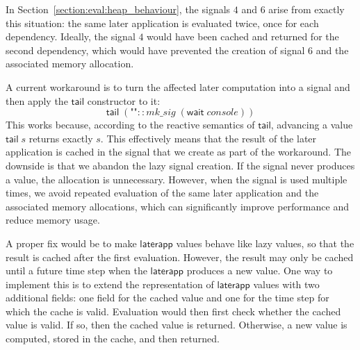 In Section~\ref{section:eval:heap_behaviour}, the signals $4$ and $6$ arise from exactly this situation: the same later application is evaluated twice, once for each dependency. Ideally, the signal $4$ would have been cached and returned for the second dependency, which would have prevented the creation of signal $6$ and the associated memory allocation. 

A current workaround is to turn the affected later computation into a signal and then apply the $\mathsf{tail}$ constructor to it:
\[
\mathsf{tail} \; (\texttt{""} :: mk\_sig \; (\mathsf{wait} \; console))
\]
This works because, according to the reactive semantics of $\mathsf{tail}$, advancing a value $\mathsf{tail} \; s$ returns exactly $s$.
This effectively means that the result of the later application is cached in the signal that we create as part of the workaround.
The downside is that we abandon the lazy signal creation. If the signal never produces a value, the allocation is unnecessary.
However, when the signal is used multiple times, we avoid repeated evaluation of the same later application and the associated memory allocations, which can significantly improve performance and reduce memory usage.

A proper fix would be to make $\mathsf{laterapp}$ values behave like lazy values, so that the result is cached after the first evaluation.
However, the result may only be cached until a future time step when the $\mathsf{laterapp}$ produces a new value.
One way to implement this is to extend the representation of $\mathsf{laterapp}$ values with two additional fields: one field for the cached value and one for the time step for which the cache is valid.
Evaluation would then first check whether the cached value is valid. If so, then the cached value is returned. Otherwise, a new value is computed, stored in the cache, and then returned.

